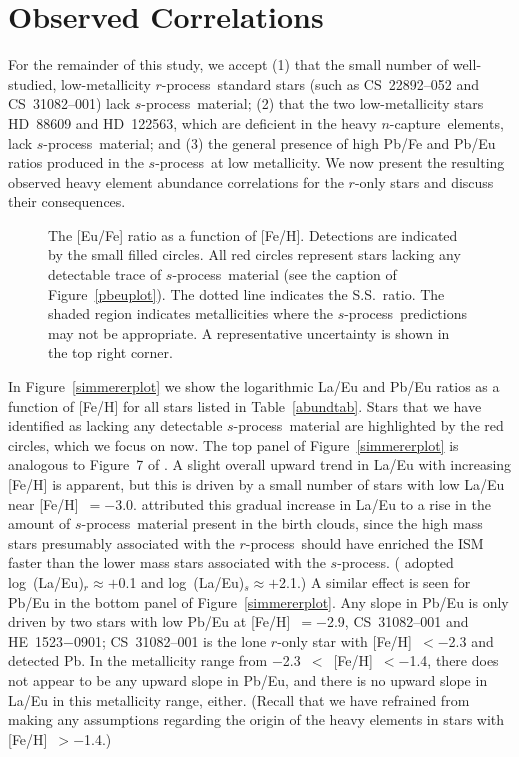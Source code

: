 \documentclass{emulateapj}
\def\rpro{\mbox{$r$-process}}
\def\spro{\mbox{$s$-process}}
\def\ncap{\mbox{$n$-capture}}
\begin{document}
\section{Observed Correlations}
\label{correlations}


For the remainder of this study, we accept
(1) that the small number of well-studied, 
low-metallicity \rpro\ standard stars 
(such as \mbox{CS~22892--052} and \mbox{CS~31082--001})
lack \spro\ material;
(2) that the two low-metallicity stars \mbox{HD~88609} and \mbox{HD~122563},
which are deficient in the heavy \ncap\ elements,
lack \spro\ material; and 
(3) the general presence of high Pb/Fe and Pb/Eu ratios produced 
in the \spro\ at low metallicity.
We now present the resulting
observed heavy element abundance correlations for the $r$-only stars
and discuss their consequences.

\begin{figure}
\begin{center}
\end{center}
\caption{
\label{eufeplot}
The [Eu/Fe] ratio as a function of [Fe/H].
Detections are indicated by the small filled circles.
All red circles represent stars lacking any detectable
trace of \spro\ material (see the caption of Figure~\ref{pbeuplot}).
The dotted line indicates the S.S.\ ratio.
The shaded region indicates metallicities where the
\spro\ predictions may not be appropriate.
A representative uncertainty is shown 
in the top right corner.
}
\end{figure}

In Figure~\ref{simmererplot} we show the logarithmic La/Eu and Pb/Eu 
ratios as a function of [Fe/H] for all stars listed in Table~\ref{abundtab}.
Stars that we have identified as lacking any detectable \spro\ material
are highlighted by the red circles, which we focus on now.
The top panel of Figure~\ref{simmererplot} is analogous to Figure~7 of
\citet{simmerer04}.  
A slight overall upward trend in La/Eu with increasing [Fe/H] 
is apparent, but this is driven by a small number of stars
with low La/Eu near [Fe/H]~$= -$3.0.
\citet{simmerer04} attributed this gradual increase in La/Eu to 
a rise in the amount of \spro\ material present in the birth clouds,
since the high mass stars presumably associated with the \rpro\ 
should have enriched the ISM faster than the lower mass stars
associated with the \spro.
(\citealt{simmerer04} adopted log~(La/Eu)$_{r} \approx +$0.1 and 
log~(La/Eu)$_{s} \approx +$2.1.)
A similar effect is seen for Pb/Eu in the bottom panel of
Figure~\ref{simmererplot}.
Any slope in Pb/Eu is only driven by two stars
with low Pb/Eu at [Fe/H]~$= -$2.9, 
\mbox{CS~31082--001} and \mbox{HE~1523$-$0901};
\mbox{CS~31082--001} is the lone $r$-only star with [Fe/H]~$< -$2.3
and detected Pb.
In the metallicity range from $-$2.3~$<$~[Fe/H]~$< -$1.4, 
there does not appear to be any upward slope in Pb/Eu,
and there is no upward slope in La/Eu in this metallicity range, either.
(Recall that we have refrained from making any assumptions regarding
the origin of the heavy elements in stars with [Fe/H]~$> -$1.4.)
\end{document}
